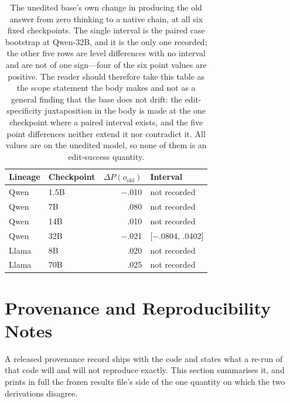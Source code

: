 \documentclass[letterpaper]{article}
\begin{document}
\begin{table}[t]
\centering
\small
\begin{tabular}{@{}llrl@{}}
\toprule
Lineage & Checkpoint & \(\Delta P(o_{\mathrm{old}})\) & Interval \\
\midrule
Qwen  & 1.5B & $-$.010 & not recorded \\
Qwen  & 7B   & .080    & not recorded \\
Qwen  & 14B  & .010    & not recorded \\
Qwen  & 32B  & $-$.021 & [$-$.0804, .0402] \\
Llama & 8B   & .020    & not recorded \\
Llama & 70B  & .025    & not recorded \\
\bottomrule
\end{tabular}
\caption{The unedited base's own change in producing the old answer from zero
thinking to a native chain, at all six fixed checkpoints.  The single interval is
the paired case bootstrap at Qwen-32B, and it is the only one recorded; the other
five rows are level differences with no interval and are not of one sign---four
of the six point values are positive.  The reader should therefore take this
table as the scope statement the body makes and not as a general finding that
the base does not drift: the edit-specificity juxtaposition in the body is made
at the one checkpoint where a paired interval exists, and the five point
differences neither extend it nor contradict it.  All values are on the unedited
model, so none of them is an edit-success quantity.}
\label{tab:s8-base}
\end{table}

\section{Provenance and Reproducibility Notes}
A released provenance record ships with the code and states what a re-run of
that code will and will not reproduce exactly.  This section summarises it, and
prints in full the frozen results file's side of the one quantity on which the
two derivations disagree.
\end{document}

